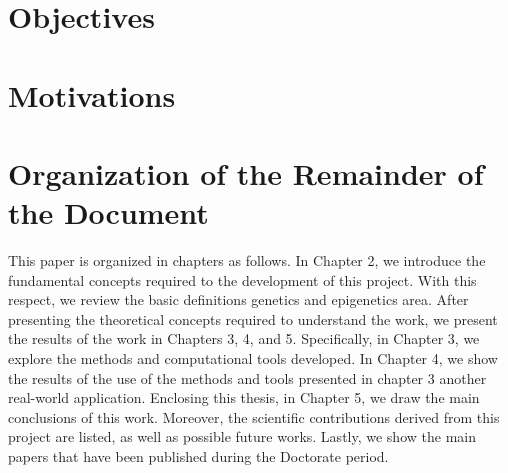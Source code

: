 
\newcommand{\comando}[1]{\textbf{$\backslash$#1}}


\section{Objectives}

\section{Motivations}

\section{Organization of the Remainder of the Document}

This paper is organized in chapters as follows. In Chapter 2, we introduce
the fundamental concepts required to the development 
of this project. With this respect, we review the basic definitions genetics and epigenetics area. After presenting the theoretical concepts required to understand the work, we present the results of the work in Chapters 3, 4, and 5. Specifically, in
Chapter 3, we explore the methods and computational tools developed. 
In Chapter 4, we show the results of the use of the methods and tools presented in chapter 3 another real-world application. Enclosing this thesis, in Chapter 5, we draw the
main conclusions of this work. Moreover, the scientific contributions derived from this
project are listed, as well as possible future works. Lastly, we show the main papers
that have been published during the Doctorate period.

